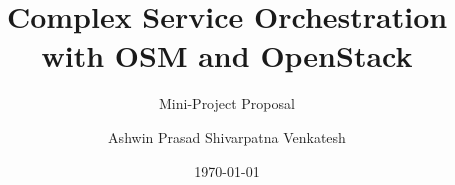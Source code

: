 \title{Complex Service Orchestration with OSM and OpenStack} 

\subtitle{Mini-Project Proposal}

\author{Ashwin Prasad Shivarpatna Venkatesh}


\date{\today} 

\newcommand{\upbcolor}{uni-blue} 

